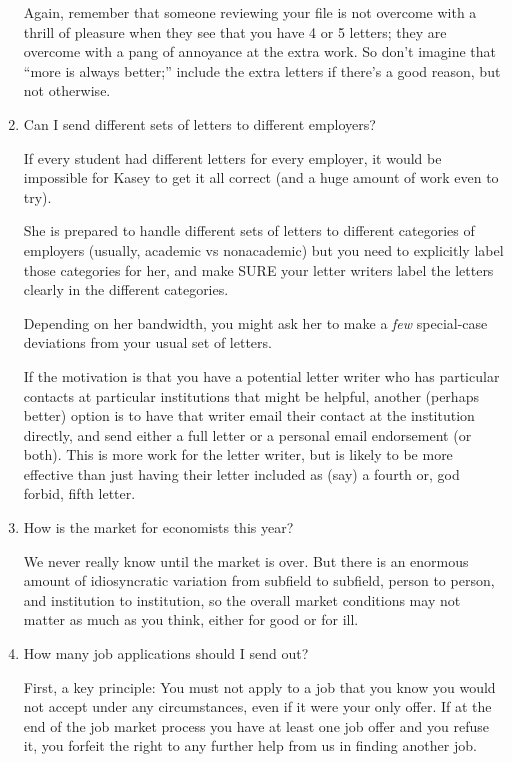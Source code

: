 \documentclass{econtex}
\begin{document}
\begin{enumerate}
Again, remember that someone reviewing your file is not overcome with
a thrill of pleasure when they see that you have 4 or 5 letters; they
are overcome with a pang of annoyance at the extra work.  So don't
imagine that ``more is always better;'' include the extra letters if
there's a good reason, but not otherwise.


\item Can I send different sets of letters to different employers?

  If every student had different letters for every employer, it would be impossible for Kasey to get it all correct (and a huge amount of work even to try).

  She is prepared to handle different sets of letters to different categories of employers (usually, academic vs nonacademic) but you need to explicitly label those categories for her, and make SURE your letter writers label the letters clearly in the different categories.

  Depending on her bandwidth, you might ask her to make a \textit{few} special-case deviations from your usual set of letters.

  If the motivation is that you have a potential letter writer who has particular contacts at particular institutions that might be helpful, another (perhaps better) option is to have that writer email their contact at the institution directly, and send either a full letter or a personal email endorsement (or both).  This is more work for the letter writer, but is likely to be more effective than just having their letter included as (say) a fourth or, god forbid, fifth letter.

\item How is the market for economists this year?

We never really know until the market is over.  But there is an enormous amount of idiosyncratic
variation from subfield to subfield, person to person, and institution to
institution, so the overall market conditions may not matter as much
as you think, either for good or for ill.

\item {} 
How many job applications should I send out?

First, a key principle: You must not apply to a job that you know you would not
accept under any circumstances, even if it were your only offer.  If
at the end of the job market process you have at least one job offer
and you refuse it, you forfeit the right to any further help from us
in finding another job.  %


\end{enumerate}
\end{document}

